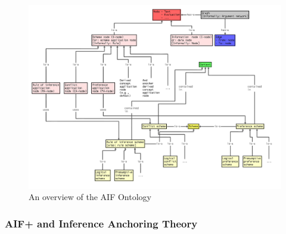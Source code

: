 \begin{figure}
\begin{center}
\includegraphics[scale=0.42]{./figures/ontologies/aif.png}
\caption{An overview of the AIF Ontology \citep{Chesnevar2006}}
\label{figure:ontologies:aif}
\end{center}
\end{figure}

\subsubsection{AIF+ and Inference Anchoring Theory}



